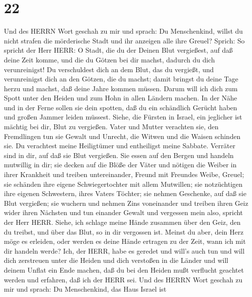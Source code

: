 \hypertarget{section-21}{%
\section{22}\label{section-21}}

 Und des HERRN Wort geschah zu mir und sprach: 
Du Menschenkind, willst du nicht strafen die mörderische Stadt und ihr
anzeigen alle ihre Greuel?  Sprich: So spricht der Herr
HERR: O Stadt, die du der Deinen Blut vergießest, auf daß deine Zeit
komme, und die du Götzen bei dir machst, dadurch du dich verunreinigst!
 Du verschuldest dich an dem Blut, das du vergießt, und
verunreinigst dich an den Götzen, die du machst; damit bringst du deine
Tage herzu und machst, daß deine Jahre kommen müssen. Darum will ich
dich zum Spott unter den Heiden und zum Hohn in allen Ländern machen.
 In der Nähe und in der Ferne sollen sie dein spotten, daß
du ein schändlich Gerücht haben und großen Jammer leiden müssest.
 Siehe, die Fürsten in Israel, ein jeglicher ist mächtig bei
dir, Blut zu vergießen.  Vater und Mutter verachten sie, den
Fremdlingen tun sie Gewalt und Unrecht, die Witwen und die Waisen
schinden sie.  Du verachtest meine Heiligtümer und
entheiligst meine Sabbate.  Verräter sind in dir, auf daß
sie Blut vergießen. Sie essen auf den Bergen und handeln mutwillig in
dir;  sie decken auf die Blöße der Väter und nötigen die
Weiber in ihrer Krankheit  und treiben untereinander,
Freund mit Freundes Weibe, Greuel; sie schänden ihre eigene
Schwiegertochter mit allem Mutwillen; sie notzüchtigen ihre eigenen
Schwestern, ihres Vaters Töchter;  sie nehmen Geschenke,
auf daß sie Blut vergießen; sie wuchern und nehmen Zins voneinander und
treiben ihren Geiz wider ihren Nächsten und tun einander Gewalt und
vergessen mein also, spricht der Herr HERR.  Siehe, ich
schlage meine Hände zusammen über den Geiz, den du treibst, und über das
Blut, so in dir vergossen ist.  Meinst du aber, dein Herz
möge es erleiden, oder werden es deine Hände ertragen zu der Zeit, wann
ich mit dir handeln werde? Ich, der HERR, habe es geredet und will's
auch tun  und will dich zerstreuen unter die Heiden und
dich verstoßen in die Länder und will deinem Unflat ein Ende machen,
 daß du bei den Heiden mußt verflucht geachtet werden und
erfahren, daß ich der HERR sei.  Und des HERRN Wort geschah
zu mir und sprach:  Du Menschenkind, das Haus Israel ist
